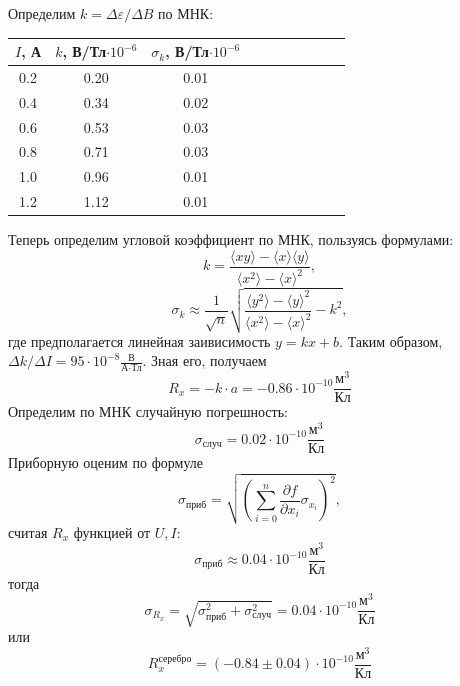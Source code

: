 \documentclass[14pt]{article}
\begin{document}
\vspace{1cm}
Определим $k = \Delta\varepsilon/\Delta B$ по МНК:

\begin{center}
\begin{tabular}{|c|c|c|c|c|c|c|c|c|c|}
\hline
$I$, А		&	$k$, В/Тл$\cdot 10^{-6}$	&	$\sigma_k$, В/Тл$\cdot 10^{-6}$	\\
\hline
0.2			&	0.20						&	0.01								\\
\hline
0.4			&	0.34						&	0.02								\\
\hline
0.6			&	0.53						&	0.03								\\
\hline
0.8			&	0.71						&	0.03								\\
\hline
1.0			&	0.96						&	0.01								\\
\hline
1.2			&	1.12						&	0.01								\\
\hline
\end{tabular}
\end{center}


\begin{flushleft}
\end{flushleft}

Теперь определим угловой коэффициент по МНК, пользуясь формулами:
$$
	k = \frac{\langle xy\rangle - \langle x\rangle\langle y\rangle}{\langle x^2\rangle - \langle x\rangle^2},
$$
$$
	\sigma_k \approx \frac{1}{\sqrt{n}}\sqrt{\frac{\langle y^2\rangle - \langle y\rangle^2}{\langle x^2\rangle - \langle x\rangle^2} - k^2},
$$
\noindent где предполагается линейная заивисимость $y = kx + b$. Таким образом, $\Delta k/\Delta I = 95\cdot 10^{-8} \frac{\text{В}}{\text{А}\cdot\text{Тл}}$. Зная его, получаем 
$$
	R_x = -k\cdot a = -0.86 \cdot 10^{-10} \frac{\text{м}^3}{\text{Кл}}
$$
Определим по МНК случайную погрешность:
$$
	\sigma_{\text{случ}} = 0.02 \cdot 10^{-10}\frac{\text{м}^3}{\text{Кл}}
$$
Приборную оценим по формуле 
$$
	\sigma_{\text{приб}} = \sqrt{\left(\sum_{i = 0}^n \frac{\partial f}{\partial x_i}\sigma_{x_i}\right)^2},
$$
\noindent считая $R_x$ функцией от $U, I$:
$$
	\sigma_{\text{приб}} \approx 0.04 \cdot 10^{-10}\frac{\text{м}^3}{\text{Кл}}
$$
\noindent тогда 
$$
	\sigma_{R_x} = \sqrt{\sigma_{\text{приб}}^2 + \sigma_{\text{случ}}^2} = 0.04 \cdot 10^{-10} \frac{\text{м}^3}{\text{Кл}}
$$
\noindent или
$$
	\boxed{R_x^{\text{серебро}} = (-0.84 \pm 0.04) \cdot 10^{-10} \frac{\text{м}^3}{\text{Кл}}}
$$
\end{document}

